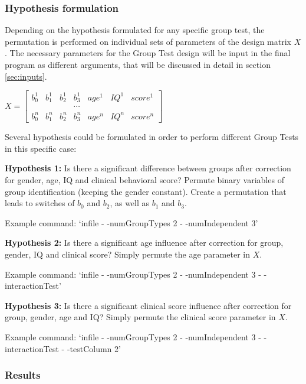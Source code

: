 \documentclass{InsightArticle}
\begin{document}
\subsubsection{Hypothesis formulation}
\label{sec:hypho}


Depending on the hypothesis formulated for any specific group test, the permutation is performed on individual sets of parameters of the design matrix $X$. The necessary parameters for the Group Test design will be input in the final program as different arguments, that will be discussed in detail in section \ref{sec:inputs}. 

\vspace{.1 in}
\begin{center}
$X = \left[ \begin{array}{ccccccc} b^1_0 & b^1_1 & b^1_2 & b^1_3 & age^1 & IQ^1 & score^1 \\ & & & \cdots & & & \\ b^n_0 & b^n_1 & b^n_2 & b^n_3 & age^n & IQ^n & score^n  \end{array} \right]$
\end{center}
\vspace{.1 in}

Several hypothesis could be formulated in order to perform different Group Tests in this specific case:

\textbf{ Hypothesis 1:} Is there a significant difference between groups after correction for gender, age, IQ and clinical behavioral score? Permute binary variables of group identification (keeping the gender constant). Create a permutation that leads to switches of $b_0$ and $b_2$, as well as $b_1$ and $b_3$.

Example command: `\program infile - -numGroupTypes 2 - -numIndependent 3'

\textbf{Hypothesis 2:} Is there a significant age influence after correction for group, gender, IQ and clinical score? Simply permute the age parameter in $X$.

Example command: `\program infile - -numGroupTypes 2 - -numIndependent 3 - -interactionTest'

\textbf{Hypothesis 3:} Is there a significant clinical score influence after correction for group, gender, age and IQ? Simply permute the clinical score parameter in $X$.

Example command: `\program infile - -numGroupTypes 2 - -numIndependent 3 - -interactionTest - -testColumn 2'

\subsubsection{Results}
\label{sec:lilresults}
\end{document}
